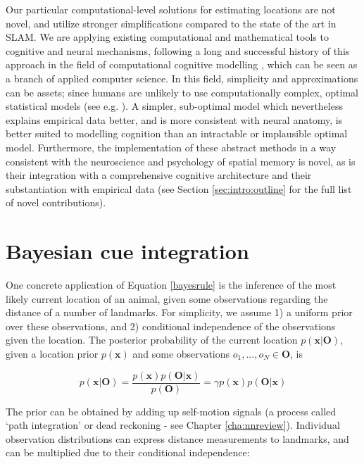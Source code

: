 Our particular computational-level solutions for estimating locations are not novel, and utilize stronger simplifications compared to the state of the art in SLAM. We are applying existing computational and mathematical tools to cognitive and neural mechanisms, following a long and successful history of this approach in the field of computational cognitive modelling \citep{sun2008introduction}, which can be seen as a branch of applied computer science. In this field, simplicity and approximations can be assets; since humans are unlikely to use computationally complex, optimal statistical models (see e.g. \citep{van2008tractable,simon1955behavioral}). A simpler, sub-optimal model which nevertheless explains empirical data better, and is more consistent with neural anatomy, is better suited to modelling cognition than an intractable or implausible optimal model. Furthermore, the implementation of these abstract methods in a way consistent with the neuroscience and psychology of spatial memory is novel, as is their integration with a comprehensive cognitive architecture and their substantiation with empirical data (see Section \ref{sec:intro:outline} for the full list of novel contributions). 

\section{Bayesian cue integration}

One concrete application of Equation \ref{bayesrule} is the inference of the most likely current location of an animal, given some observations regarding the distance of a number of landmarks. For simplicity, we assume 1) a uniform prior over these observations, and 2) conditional independence of the observations given the location. The posterior probability of the current location $p(\bm x | \bm O)$, given a location prior $p(\bm x)$ and some observations $o_1, ..., o_N \in \bm O$, is 

\begin{equation}\label{bayes1}
p( \bm x | \bm O ) = \frac{p( \bm x ) p( \bm O | \bm x )}{p(\bm O)} = \gamma p( \bm x ) p( \bm O | \bm x )
\end{equation}

The prior can be obtained by adding up self-motion signals (a process called `path integration' or dead reckoning - see Chapter \ref{cha:nnreview}). Individual observation distributions can express distance measurements to landmarks, and can be multiplied due to their conditional independence:

